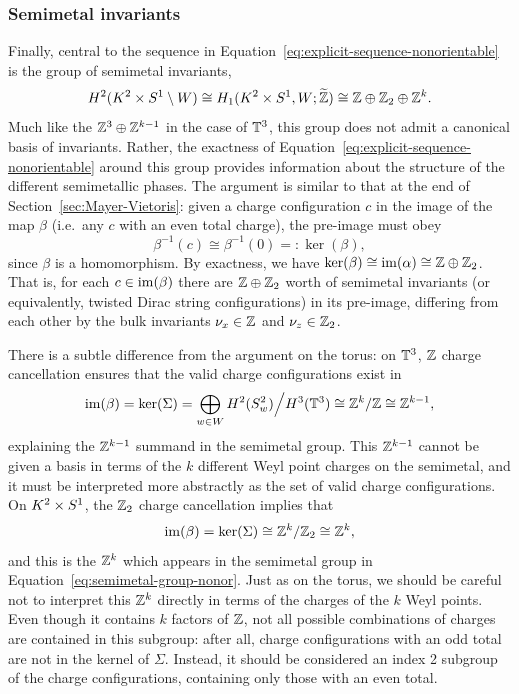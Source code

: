 \subsubsection{Semimetal invariants}

Finally, central to the sequence in Equation~\eqref{eq:explicit-sequence-nonorientable} is the group of semimetal invariants,
\begin{equation}\label{eq:semimetal-group-nonor}
	H^2(K^2\times S^1\setminus W)\cong H_1(K^2\times S^1, W; \widetilde{\mathbb{Z}})\cong \mathbb{Z}\oplus\mathbb{Z}_2\oplus\mathbb{Z}^k.
\end{equation}
Much like the $\mathbb{Z}^3\oplus\mathbb{Z}^{k-1}$ in the case of $\mathbb{T}^3$, this group does not admit a canonical basis of invariants. Rather, the exactness of Equation~\eqref{eq:explicit-sequence-nonorientable} around this group provides information about the structure of the different semimetallic phases. The argument is similar to that at the end of Section~\ref{sec:Mayer-Vietoris}: given a charge configuration $c$ in the image of the map $\beta$ (i.e.\ any $c$ with an even total charge), the pre-image must obey
\begin{equation*}
	\beta^{-1}(c) \cong \beta^{-1}(0) =: \ker(\beta),
\end{equation*}
since $\beta$ is a homomorphism. By exactness, we have $\ker(\beta)\cong\operatorname{im}(\alpha)\cong\mathbb{Z}\oplus\mathbb{Z}_2$. %
That is, for each $c\in\operatorname{im}(\beta)$ there are $\mathbb{Z}\oplus\mathbb{Z}_2$ worth of %
semimetal invariants (or equivalently, twisted Dirac string configurations) in its pre-image, differing from each other by the bulk invariants $\nu_x\in\mathbb{Z}$ and $\nu_z\in\mathbb{Z}_2$.

There is a subtle difference from the argument on the torus: on $\mathbb{T}^3$, $\mathbb{Z}$ charge cancellation ensures that the valid charge configurations exist in 
\begin{equation*}
	\operatorname{im}(\beta) = \ker(\Sigma) = \bigoplus_{w\in W} H^2(S_w^2) \Big/ H^3(\mathbb{T}^3) \cong \mathbb{Z}^k/\mathbb{Z} \cong \mathbb{Z}^{k-1},
\end{equation*}
explaining the $\mathbb{Z}^{k-1}$ summand in the semimetal group. This $\mathbb{Z}^{k-1}$ cannot be given a basis in terms of the $k$ different Weyl point charges on the semimetal, and it must be interpreted more abstractly as the set of valid charge configurations. On $K^2\times S^1$, the $\mathbb{Z}_2$ charge cancellation implies that
\begin{equation*}
	\operatorname{im}(\beta)=\ker(\Sigma)\cong\mathbb{Z}^k/\mathbb{Z}_2\cong\mathbb{Z}^k,
\end{equation*}
and this is the $\mathbb{Z}^k$ which appears in the semimetal group in Equation~\eqref{eq:semimetal-group-nonor}. Just as on the torus, we should be careful not to interpret this $\mathbb{Z}^k$ directly in terms of the charges of the $k$ Weyl points. Even though it contains $k$ factors of $\mathbb{Z}$, not all possible combinations of charges are contained in this subgroup: after all, charge configurations with an odd total are not in the kernel of $\Sigma$. Instead, it should be considered an index 2 subgroup of the charge configurations, containing only those with an even total.

